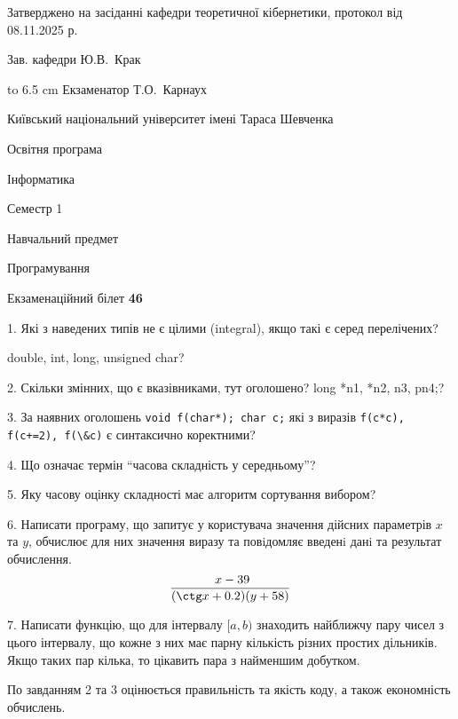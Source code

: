 \documentclass[12pt, ukrainian]{article}
\def\code#1{\Verb!#1!}
\begin{document}
{\smallskip\smallskip \begin {scriptsize} Затверджено на засіданні кафедри теоретичної кібернетики, протокол   від   08.11.2025 р.\par\smallskip\smallskip\smallskip\smallskip
{\parbox {6.5 cm} {Зав. кафедри \dotfill Ю.В.~Крак}}\hspace {0.7cm} {\hbox to 6.5 cm { Екзаменатор \dotfill Т.О.~Карнаух}} \end{scriptsize}}
\vspace{0.9cm}
{{\begin {scriptsize}\par
{ \center  Київський національний університет імені Тараса Шевченка \par}
{\parbox {5 cm}{Освітня програма \hfill}{\parbox {7 cm}{Інформатика\hfill}}\parbox {6 cm}{\hfill Семестр 1}}\par
{\parbox {5 cm} {Навчальний предмет \hfill}\parbox {7 cm}{Програмування \hfill}\parbox {6cm}{\hfill}\par}\vspace{-15pt} \end{scriptsize}}{\center Екзаменаційний білет \No \textbf { 46 }\par}}
{%
1. Які з наведених типів не є цілими (integral), якщо такі є серед перелічених?

double, int, long, unsigned char?
\par
\vspace{2mm}
2. Скільки змінних, що є вказівниками, тут оголошено?
long *n1, *n2, n3, pn4;?
\par
\vspace{2mm}
3. За наявних оголошень \code{void f(char*); char c;} які з виразів \code{f(c*c), f(c+=2), f(\&c)} є синтаксично коректними?
\par
\vspace{2mm}
4. Що означає термін ``часова складність у середньому''?
\par
\vspace{2mm}
5. Яку часову оцінку складності має алгоритм сортування вибором?
\par
\vspace{2mm}
6. Написати програму, що запитує у користувача значення дійсних параметрів $x$ та $y$, обчислює для них значення виразу та повiдомляє введенi данi та результат обчислення.
$$\frac{\ x - 39}{(\ctg x + 0.2) (y + 58)}$$ 

\par
7. Написати функцію, що для інтервалу $[a, b)$ знаходить найближчу пару чисел з цього інтервалу, що кожне з них має парну кількість різних простих дільників. Якщо таких пар кілька, то цікавить пара з найменшим добутком.

По завданням 2 та 3 оцінюється правильність та якість коду, а також економність обчислень.

}
\end{document}
